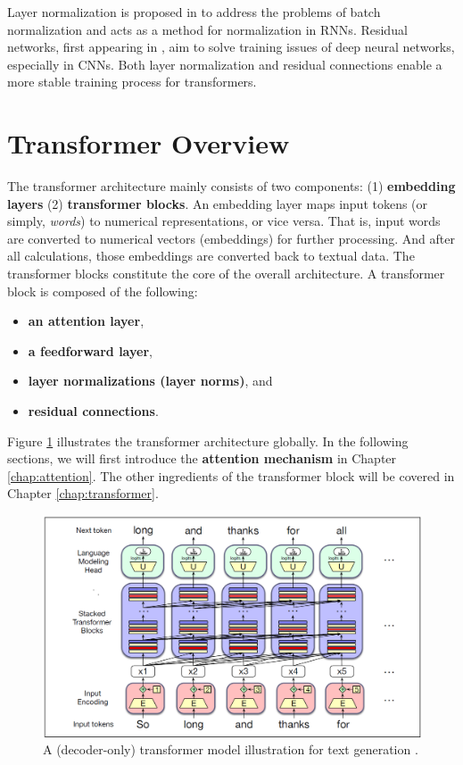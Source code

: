 Layer normalization is proposed in \cite{ba2016layer} to address the problems of batch normalization and acts as a method for normalization in RNNs. Residual networks, first appearing in \cite{he2016deep}, aim to solve training issues of deep neural networks, especially in CNNs. Both layer normalization and residual connections enable a more stable training process for transformers.

\section{Transformer Overview} \label{sec:transformer_overview}

The transformer architecture mainly consists of two components: (1) \textbf{embedding layers} (2) \textbf{transformer blocks}. An embedding layer maps input tokens (or simply, \textit{words}) to numerical representations, or vice versa. That is, input words are converted to numerical vectors (embeddings) for further processing. And after all calculations, those embeddings are converted back to textual data. The transformer blocks constitute the core of the overall architecture. A transformer block is composed of the following:

\begin{itemize}
    \item \textbf{an attention layer},
    \item \textbf{a feedforward layer},
    \item \textbf{layer normalizations (layer norms)}, and
    \item \textbf{residual connections}.
\end{itemize}

Figure \ref{fig:tranformer_atchitecture} illustrates the transformer architecture globally. In the following sections, we will first introduce the \textbf{attention mechanism} in Chapter \ref{chap:attention}. The other ingredients of the transformer block will be covered in Chapter \ref{chap:transformer}.

\begin{figure}
    \centering
    \includegraphics[width=1\linewidth]{fig/transformer_architecture.png}
    \caption{A (decoder-only) transformer model illustration for text generation \cite{jm3}.}
    \label{fig:tranformer_atchitecture}
\end{figure}